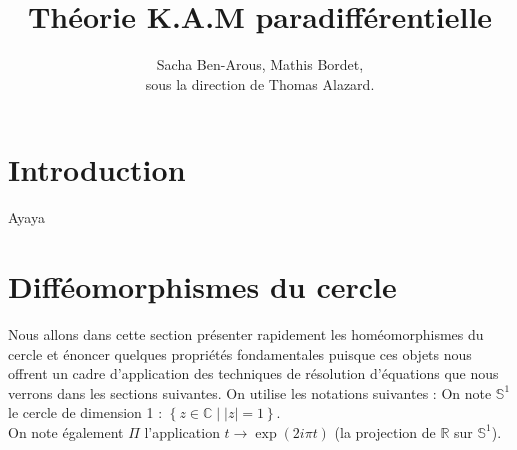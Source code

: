 \documentclass[11pt,a4paper]{article}
\title{\textbf{Théorie K.A.M paradifférentielle}}
\date{}
\author{Sacha Ben-Arous, Mathis Bordet, \\ sous la direction de Thomas Alazard.}
\begin{document}
\maketitle
\tableofcontents
\newpage





\section{Introduction}
Ayaya

\section{Difféomorphismes du cercle}
Nous allons dans cette section présenter rapidement les homéomorphismes du cercle et énoncer quelques propriétés fondamentales puisque ces objets nous offrent un cadre d'application des techniques de résolution d'équations que nous verrons dans les sections suivantes. On utilise les notations suivantes :
On note $\mathbb{S}^1$ le cercle de dimension 1 : $\left\{ z \in \mathbb{C} \mid |z|=1 \right\}$.
\\
On note également $\Pi$ l'application $ t \to \exp (2i\pi t) $ (la projection de $\mathbb{R}$ sur $\mathbb{S}^1$).
\end{document}
